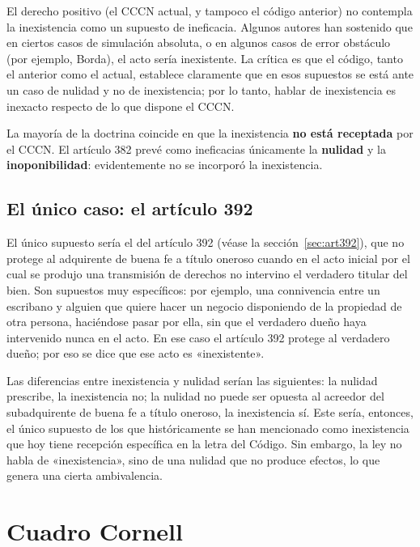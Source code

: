 \documentclass[12pt,oneside]{book}
\begin{document}
El derecho positivo (el CCCN actual, y tampoco el código anterior) no contempla la inexistencia como un supuesto de ineficacia. Algunos autores han sostenido que en ciertos casos de simulación absoluta, o en algunos casos de error obstáculo (por ejemplo, Borda), el acto sería inexistente. La crítica es que el código, tanto el anterior como el actual, establece claramente que en esos supuestos se está ante un caso de nulidad y no de inexistencia; por lo tanto, hablar de inexistencia es inexacto respecto de lo que dispone el CCCN.

\begin{important}
La mayoría de la doctrina coincide en que la inexistencia \textbf{no está receptada} por el CCCN. El artículo 382 prevé como ineficacias únicamente la \textbf{nulidad} y la \textbf{inoponibilidad}: evidentemente no se incorporó la inexistencia.
\end{important}

\subsection*{El único caso: el artículo 392}

El único supuesto sería el del artículo 392 (véase la sección~\ref{sec:art392}), que no protege al adquirente de buena fe a título oneroso cuando en el acto inicial por el cual se produjo una transmisión de derechos no intervino el verdadero titular del bien. Son supuestos muy específicos: por ejemplo, una connivencia entre un escribano y alguien que quiere hacer un negocio disponiendo de la propiedad de otra persona, haciéndose pasar por ella, sin que el verdadero dueño haya intervenido nunca en el acto. En ese caso el artículo 392 protege al verdadero dueño; por eso se dice que ese acto es «inexistente».

Las diferencias entre inexistencia y nulidad serían las siguientes: la nulidad prescribe, la inexistencia no; la nulidad no puede ser opuesta al acreedor del subadquirente de buena fe a título oneroso, la inexistencia sí. Este sería, entonces, el único supuesto de los que históricamente se han mencionado como inexistencia que hoy tiene recepción específica en la letra del Código. Sin embargo, la ley no habla de «inexistencia», sino de una nulidad que no produce efectos, lo que genera una cierta ambivalencia.

\clearpage
\section{Cuadro Cornell}
\end{document}
